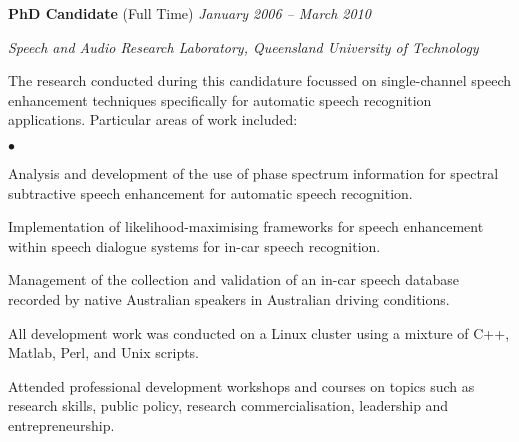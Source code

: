 \documentclass[margin,line]{resume}
\newenvironment{list1}{
  \begin{list}{}{%
      \setlength{\itemsep}{0in}
      \setlength{\parsep}{0in} \setlength{\parskip}{0in}
      \setlength{\topsep}{0in} \setlength{\partopsep}{0in}
      \setlength{\leftmargin}{0.17in}}}{\end{list}}
\newenvironment{list2}{
  \begin{list}{$\bullet$}{%
      \setlength{\itemsep}{0in}
      \setlength{\parsep}{0in} \setlength{\parskip}{0in}
      \setlength{\topsep}{0in} \setlength{\partopsep}{0in}
      \setlength{\leftmargin}{0.2in}}}{\end{list}}
\begin{document}
\begin{resume}
{\textbf{PhD Candidate} (Full Time)} \hfill {\it January 2006 -- March 2010}\\
\vspace{-0.85\baselineskip}
\begin{list1}
\item {\it Speech and Audio Research Laboratory, Queensland University of Technology}
\item The research conducted during this candidature
    focussed on single-channel speech enhancement techniques specifically for automatic speech recognition
    applications. Particular areas of work included:
%
%
\begin{list2}
\item Analysis and development of the use of phase spectrum
    information for spectral subtractive speech enhancement for automatic speech
    recognition.
\item Implementation of likelihood-maximising frameworks for
    speech enhancement within speech dialogue systems for in-car speech recognition.
\item Management of the collection and validation of an in-car
    speech database recorded by native Australian speakers in Australian
    driving conditions.
\item All development work was conducted on a Linux cluster using
    a mixture of C++, Matlab, Perl, and Unix scripts.
\item Attended professional development workshops and courses on topics such as research skills, public policy, research commercialisation, leadership and entrepreneurship.
\end{list2}
\end{list1}


\end{resume}
\end{document}
